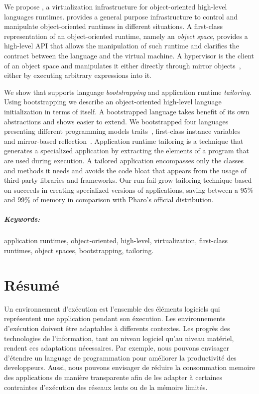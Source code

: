 \documentclass[a4paper,11pt,twoside]{include/ThesisStyle}
\begin{document}
We propose \Vtt, a virtualization infrastructure for object-oriented high-level languages runtimes. \Vtt provides a general purpose infrastructure to control and manipulate object-oriented runtimes in different situations. A first-class representation of an object-oriented runtime, namely an \emph{object space}, provides a high-level API that allows the manipulation of such runtime and clarifies the contract between the language and the virtual machine. A hypervisor is the client of an object space and manipulates it either directly through mirror objects~\cite{Brac04b}, either by executing arbitrary expressions into it.

We show that \Vtt supports language \emph{bootstrapping} and application runtime \emph{tailoring}. Using bootstrapping we describe an object-oriented high-level language initialization in terms of itself. A bootstrapped language takes benefit of its own abstractions and shows easier to extend. We bootstrapped four languages presenting different programming models \eg traits~\cite{Scha03a}, first-class instance variables~\cite{Verw11a} and mirror-based reflection~\cite{Brac04b}.  Application runtime tailoring is a technique that generates a specialized application by extracting the elements of a program that are used during execution. A tailored application encompasses only the classes and methods it needs and avoids the code bloat that appears from the usage of third-party libraries and frameworks. Our run-fail-grow tailoring technique based on \Vtt succeeds in creating specialized versions of applications, saving between a 95\% and 99\% of memory in comparison with Pharo's official distribution.

\paragraph{Keywords:} application runtimes, object-oriented, high-level, virtualization, first-class runtimes, object spaces, bootstrapping, tailoring.

\chapter*{Résumé}

Un environnement d'exécution est l'ensemble des éléments logiciels qui représentent une application pendant son éxecution. Les environnements d'exécution doivent être adaptables à differents contextes. Les progrès des technologies de l'information, tant au niveau logiciel qu'au niveau matériel, rendent ces adaptations nécessaires. Par exemple, nous pouvons envisager d'étendre un language de programmation pour améliorer la productivité des developpeurs. Aussi, nous pouvons envisager de réduire la consommation memoire des applications de manière transparente afin de les adapter à certaines contraintes d'exécution \eg des réseaux lents ou de la mémoire limités.
\end{document}
